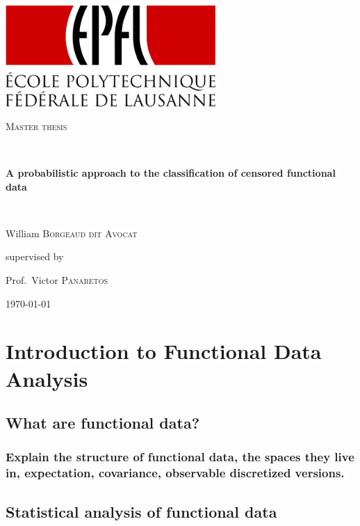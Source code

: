 \documentclass[10pt, a4paper]{report}
\theoremstyle{definition}
\theoremstyle{remark}
\begin{document}
\begin{titlepage}
	\centering
	\includegraphics[width=0.6\textwidth]{EPFL-Logo}\par\vspace{1cm}
	\vspace{1cm}
	{\scshape\Large Master thesis\par}
	\vspace{1.5cm}
	\hrulefill \\
	{\huge\bfseries A probabilistic approach to the classification of censored functional data \par}
	\hrulefill \\
	\vspace{2cm}
	{\Large William \textsc{Borgeaud dit Avocat}\par}
	\vfill
	{\Large
	supervised by\par
	Prof.~Victor \textsc{Panaretos}}
	
	\vfill
	
	{\large \today\par}
\end{titlepage}

\tableofcontents

\chapter{Introduction to Functional Data Analysis}
\section{What are functional data?}
\subsection{Explain the structure of functional data, the spaces they live in, expectation, covariance, observable discretized versions. }
\section{Statistical analysis of functional data}
\end{document}
